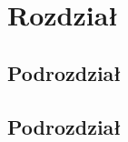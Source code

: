 \chapter{Rozdział}

\lipsum[2]

\section{Podrozdział}

\lipsum[5]

\section{Podrozdział}

\lipsum[5]


